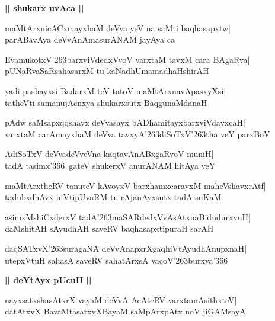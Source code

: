 \documentclass[twoside,12pt,openright]{book}
\def\S{\char'263}
\newcounter{shloka}[chapter]
\def\uvaca#1{\centerline{{\large\textbf{#1}}}}
\begin{document}
\uvaca{|| shukarx uvAca ||}
\begin{shloka}%
maMtArxnicACxmayxhaM deVva yeV na saMti baqhasapxtw|\\
parABavAya deVvAnAmasurANAM jayAya ca 
\end{shloka}

\begin{shloka}%
EvamukotxV\S barxviVdedxVvoV varxtaM tavxM cara BAgaRva|\\
pUNaRvaSaRsahasarxM tu kaNadhUmamadhaHshirAH
\end{shloka}

\begin{shloka}%
yadi pashayxsi BadarxM teV tatoV maMtArxnavApasxyXsi|\\
tatheVti samanujAcnxya shukarxsutx BaqgunaMdanaH
\end{shloka}

\begin{shloka}%
pAdw saMsapxqqshayx deVvasayx bADhamitayxbarxviVdavxcaH|\\
varxtaM carAmayxhaM deVva tavxyA\S diSoTxV\S tha veY parxBoV
\end{shloka}

\begin{shloka}%
AdiSoTxV deVvadeVveVna kaqtavAnABxgaRvoV muniH|\\
tadA tasimx\char'366\ gateV shukerxV anurANAM hitAya veY
\end{shloka}

\begin{shloka}%
maMtArxtheRV tanuteV kAvoyxV barxhamxcarayxM maheVshavxrAtf|\\
tadubxdhAvx niVtipUvaRM tu rAjanAyxsutx tadA suKaM 
\end{shloka}

\begin{shloka}%
asimxMshiCxderxV tadA\S maSARdedxVvAsAtxnaBidudurxvuH|\\
daMshitAH sAyudhAH saveRV baqhasapxtipuraH sarAH
\end{shloka}

\begin{shloka}%
daqSATxvX\S suragaNA deVvAnapxrXgaqhiVtAyudhAnupxnaH|\\
utepxVtuH sahasA saveRV sahatArxsA vacoV\S burxva\char'366
\end{shloka}

\uvaca{|| deYtAyx pUcuH ||}
\begin{shloka}%
nayxsatxshasAtxrX vayaM deVvA AcAteRV varxtamAsithxteV|\\
datAtxvX BavaMtasatxvXBayaM saMpArxpAtx noV jiGAMsayA
\end{shloka}
\end{document}
